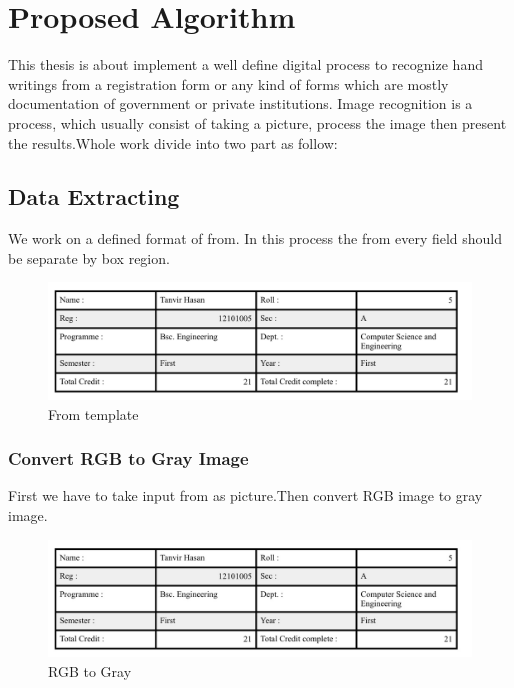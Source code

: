 \chapter{Proposed Algorithm}
\label{chap:algorithm}
This thesis is about implement a well define digital process to recognize hand writings from a registration form or any kind of forms which are mostly documentation of government or private institutions. Image recognition is a process, which usually consist of taking a picture, process the image then present the results.Whole work divide into two part as follow:
\section{Data Extracting}
We work on a defined format of from. In this process the from every field should be separate by box region.
\begin{figure}[h!]
\centering
\includegraphics[width=1\textwidth]{from}
\caption {From template}
\label {fig:FromTemplate}
\end{figure}
\subsection{Convert RGB to Gray Image}
First we have to take input from as picture.Then convert RGB image to gray image.
\begin{figure}[h!]
\centering
\includegraphics[width=1\textwidth]{GrayImage}
\caption {RGB to Gray}
\label {fig:GRAY}
\end{figure}
